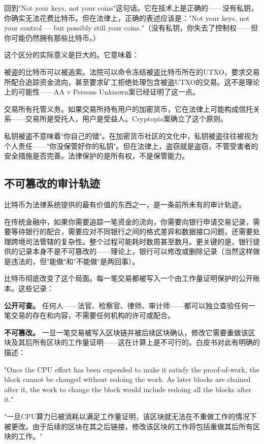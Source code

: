 \documentclass[a4paper,12pt,openany]{ctexbook}
\newenvironment{quoting}{%
  \par\vspace{0.5em}%
  \begin{list}{}{%
    \setlength{\leftmargin}{2em}%
    \setlength{\rightmargin}{2em}%
    \setlength{\parsep}{0.3em}%
    \setlength{\itemsep}{0pt}%
    \setlength{\topsep}{0pt}%
  }%
  \item\relax
}{%
  \end{list}%
  \par\vspace{0.5em}%
}
\begin{document}
回到"Not your keys, not your coins"这句话。它在技术上是正确的——没有私钥，你确实无法花费比特币。但在法律上，正确的表述应该是："Not your keys, not your control — but possibly still your coins."（没有私钥，你失去了控制权——但你可能仍然拥有那些比特币。）

这个区分的实际意义是巨大的。它意味着：

被盗的比特币可以被追索。法院可以命令冻结被盗比特币所在的UTXO，要求交易所配合追踪资金流向，甚至要求矿工拒绝处理包含被盗UTXO的交易。这不是理论上的可能性——AA v Persons Unknown案已经证明了这一点。

交易所有托管义务。如果交易所持有用户的加密货币，它在法律上可能构成信托关系——交易所是受托人，用户是受益人。Cryptopia案确立了这个原则。

私钥被盗不意味着"你自己的错"。在加密货币社区的文化中，私钥被盗往往被视为个人责任——"你没保管好你的私钥"。但在法律上，盗窃就是盗窃，不管受害者的安全措施是否完善。法律保护的是所有权，不是保管能力。


\subsection*{不可篡改的审计轨迹}


比特币为法律系统提供的最有价值的东西之一，是一条前所未有的审计轨迹。

在传统金融中，如果你需要追踪一笔资金的流向，你需要向银行申请交易记录，需要等待银行的配合，需要应对不同银行之间的格式差异和数据接口问题，还需要处理跨境司法管辖的复杂性。整个过程可能耗时数周甚至数月。更关键的是，银行提供的记录本身不是不可篡改的——理论上，银行可以修改或删除记录（当然这样做是违法的，但"能做"和"不能做"是两回事）。

比特币彻底改变了这个局面。每一笔交易都被写入一个由工作量证明保护的公开账本。这些记录：

\textbf{公开可查。} 任何人——法官、检察官、律师、审计师——都可以独立查验任何一笔交易的存在和内容，不需要任何机构的许可或配合。

\textbf{不可篡改。} 一旦一笔交易被写入区块链并被后续区块确认，修改它需要重做该区块及其后所有区块的工作量证明——这在计算上是不可行的。白皮书对此有明确的描述：


\begin{quoting}
\small
"Once the CPU effort has been expended to make it satisfy the proof-of-work, the block cannot be changed without redoing the work. As later blocks are chained after it, the work to change the block would include redoing all the blocks after it."

"一旦CPU算力已被消耗以满足工作量证明，该区块就无法在不重做工作的情况下被更改。由于后续的区块在其之后链接，修改该区块的工作将包括重做其后所有区块的工作。"
\end{quoting}
\end{document}
